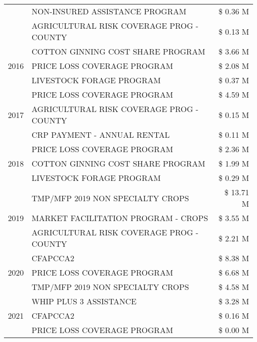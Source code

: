 \begin{tabular}{llr}
 & NON-INSURED ASSISTANCE PROGRAM & \$ 0.36 M \\
 & AGRICULTURAL RISK COVERAGE PROG - COUNTY & \$ 0.13 M \\
\cline{1-3}
\multirow[t]{3}{*}{2016} & COTTON GINNING COST SHARE PROGRAM & \$ 3.66 M \\
 & PRICE LOSS COVERAGE PROGRAM & \$ 2.08 M \\
 & LIVESTOCK FORAGE PROGRAM & \$ 0.37 M \\
\cline{1-3}
\multirow[t]{3}{*}{2017} & PRICE LOSS COVERAGE PROGRAM & \$ 4.59 M \\
 & AGRICULTURAL RISK COVERAGE PROG - COUNTY & \$ 0.15 M \\
 & CRP PAYMENT - ANNUAL RENTAL & \$ 0.11 M \\
\cline{1-3}
\multirow[t]{3}{*}{2018} & PRICE LOSS COVERAGE PROGRAM & \$ 2.36 M \\
 & COTTON GINNING COST SHARE PROGRAM & \$ 1.99 M \\
 & LIVESTOCK FORAGE PROGRAM & \$ 0.29 M \\
\cline{1-3}
\multirow[t]{3}{*}{2019} & TMP/MFP 2019 NON SPECIALTY CROPS & \$ 13.71 M \\
 & MARKET FACILITATION PROGRAM - CROPS & \$ 3.55 M \\
 & AGRICULTURAL RISK COVERAGE PROG - COUNTY & \$ 2.21 M \\
\cline{1-3}
\multirow[t]{3}{*}{2020} & CFAPCCA2 & \$ 8.38 M \\
 & PRICE LOSS COVERAGE PROGRAM & \$ 6.68 M \\
 & TMP/MFP 2019 NON SPECIALTY CROPS & \$ 4.58 M \\
\cline{1-3}
\multirow[t]{3}{*}{2021} & WHIP PLUS 3 ASSISTANCE & \$ 3.28 M \\
 & CFAPCCA2 & \$ 0.16 M \\
 & PRICE LOSS COVERAGE PROGRAM & \$ 0.00 M \\
\cline{1-3}
\bottomrule
\end{tabular}
